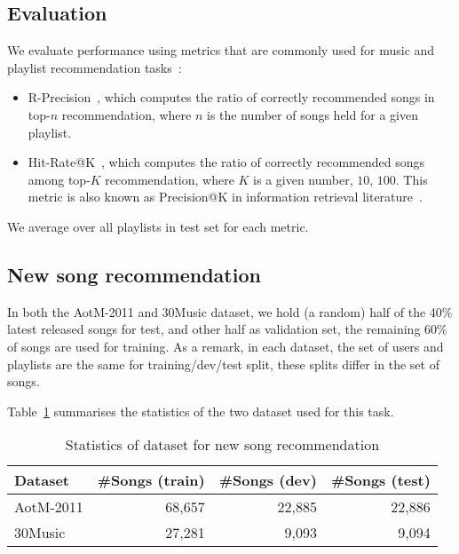 \subsection{Evaluation}
We evaluate performance using metrics that are commonly used for music and playlist recommendation 
tasks~\cite{schedl2017,hariri2012context,jannach2015beyond}:
\begin{itemize}
\item R-Precision~\cite{manning2008introIR}, which computes the ratio of correctly recommended songs in top-$n$ recommendation, 
      where $n$ is the number of songs held for a given playlist.
\item Hit-Rate@K~\cite{hariri2012context}, which computes the ratio of correctly recommended songs among top-$K$ recommendation, 
      where $K$ is a given number, \eg $10$, $100$. 
      This metric is also known as Precision@K in information retrieval literature~\cite{manning2008introIR}.
\end{itemize}
We average over all playlists in test set for each metric.


\subsection{New song recommendation}
\label{ssec:newsongrec}

In both the AotM-2011 and 30Music dataset, we hold (a random) half of the 40\% latest released songs for test,
and other half as validation set, the remaining 60\% of songs are used for training.
As a remark, in each dataset, the set of users and playlists are the same for training/dev/test split,
these splits differ in the set of songs.

Table~\ref{tab:stats_newsongrec} summarises the statistics of the two dataset used for this task.

\begin{table}[!h]
\centering
\caption{Statistics of dataset for new song recommendation}
\label{tab:stats_newsongrec}
\small
\begin{tabular}{l|rrr}
\toprule
Dataset   & \#Songs (train) & \#Songs (dev) & \#Songs (test) \\
\midrule
AotM-2011 & 68,657          & 22,885        & 22,886 \\
30Music   & 27,281          & 9,093         & 9,094  \\
\bottomrule
\end{tabular}
\end{table}

